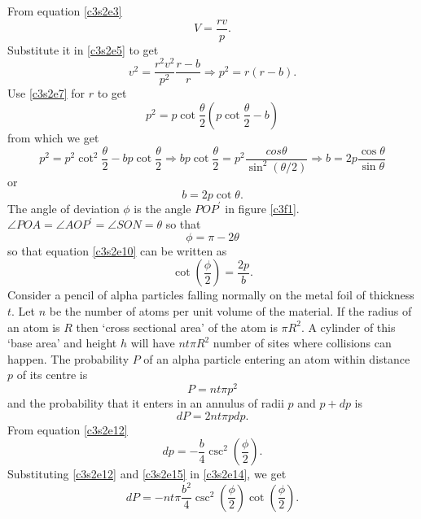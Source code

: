 From equation \eqref{c3s2e3}
\[
V = \frac{rv}{p}.
\]
Substitute it in \eqref{c3s2e5} to get
\begin{equation}\label{c3s2e8}
v^2 = \frac{r^2v^2}{p^2}\frac{r - b}{r} \Rightarrow p^2 = r(r - b).
\end{equation}
Use \eqref{c3s2e7} for $r$ to get
\begin{equation}\label{c3s2e9}
p^2 = p\cot\frac{\theta}{2}\left(p\cot\frac{\theta}{2} - b\right)
\end{equation}
from which we get
\[
p^2 = p^2\cot^2\frac{\theta}{2} - bp\cot\frac{\theta}{2} \Rightarrow
bp\cot\frac{\theta}{2} = p^2\frac{cos\theta}{\sin^2(\theta/2)} \Rightarrow
b = 2p\frac{\cos\theta}{\sin\theta}
\]
or
\begin{equation}\label{c3s2e10}
b = 2p\cot\theta.
\end{equation}
The angle of deviation $\phi$ is the angle $POP^\prime$ in figure \ref{c3f1}.
$\angle POA = \angle AOP^\prime = \angle SON = \theta$ so that
\begin{equation}\label{c2s2e11}
\phi = \pi - 2\theta
\end{equation}
so that equation \eqref{c3s2e10} can be written as
\begin{equation}\label{c3s2e12}
\cot\left(\frac{\phi}{2}\right) = \frac{2p}{b}.
\end{equation}
Consider a pencil of alpha particles falling normally on the metal foil of
thickness $t$. Let $n$ be the number of atoms per unit volume of the material.
If the radius of an atom is $R$ then `cross sectional area' of the atom is
$\pi R^2$. A cylinder of this `base area' and height $h$ will have $nt\pi R^2$
number of sites where collisions can happen. The probability $P$ of an alpha
particle entering an atom within distance $p$ of its centre is
\begin{equation}\label{c3s2e13}
P = nt \pi p^2
\end{equation}
and the probability that it enters in an annulus of radii $p$ and $p + dp$ is
\begin{equation}\label{c3s2e14}
dP = 2nt\pi pdp.
\end{equation}
From equation \eqref{c3s2e12}
\begin{equation}\label{c3s2e15}
dp=-\frac{b}{4}\csc^2\left(\frac{\phi}{2}\right).
\end{equation}
Substituting \eqref{c3s2e12} and \eqref{c3s2e15} in \eqref{c3s2e14}, we get
\begin{equation}\label{c3s2e16}
dP = -nt\pi \frac{b^2}{4}\csc^2\left(\frac{\phi}{2}\right)
\cot\left(\frac{\phi}{2}\right).
\end{equation}
